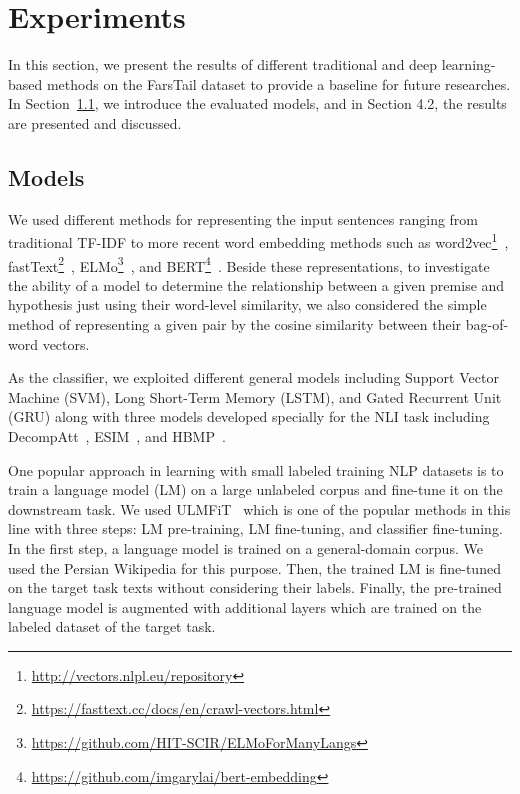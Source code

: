 \documentclass[preprint,12pt]{elsarticle}
\begin{document}
\section{Experiments}
\label{sec:experiments}
In this section, we present the results of different traditional and deep learning-based methods on the FarsTail dataset to provide a baseline for future researches. In Section~\ref{subsec:models}, we introduce the evaluated models, and in Section 4.2, the results are presented and discussed. 

\subsection{Models}
\label{subsec:models}
We used different methods for representing the input sentences ranging from traditional TF-IDF to more recent word embedding methods such as word2vec\footnote{\url{http://vectors.nlpl.eu/repository}}~\citep{mikolov2013distributed}, fastText\footnote{\url{https://fasttext.cc/docs/en/crawl-vectors.html}}~\citep{bojanowski2017enriching}, ELMo\footnote{\url{https://github.com/HIT-SCIR/ELMoForManyLangs}}~\citep{peters2018deep}, and BERT\footnote{\url{https://github.com/imgarylai/bert-embedding}}~\citep{devlin2018bert}. Beside these representations, to investigate the ability of a model to determine the relationship between a given premise and hypothesis just using their word-level similarity, we also considered the simple method of representing a given pair by the cosine similarity between their bag-of-word vectors. 

As the classifier, we exploited different general models including Support Vector Machine (SVM), Long Short-Term Memory (LSTM), and Gated Recurrent Unit (GRU) along with three models developed specially for the NLI task including DecompAtt~\citep{parikh2016decomposable}, ESIM~\citep{chen2016enhanced}, and HBMP~\citep{talman2019sentence}. 

One popular approach in learning with small labeled training NLP datasets is to train a language model (LM) on a large unlabeled corpus and fine-tune it on the downstream task. We used ULMFiT~\citep{howard2018universal} which is one of the popular methods in this line with three steps: LM pre-training, LM fine-tuning, and classifier fine-tuning. In the first step, a language model is trained on a general-domain corpus. We used the Persian Wikipedia for this purpose. Then, the trained LM is fine-tuned on the target task texts without considering their labels. Finally, the pre-trained language model is augmented with additional layers which are trained on the labeled dataset of the target task. 
\end{document}
